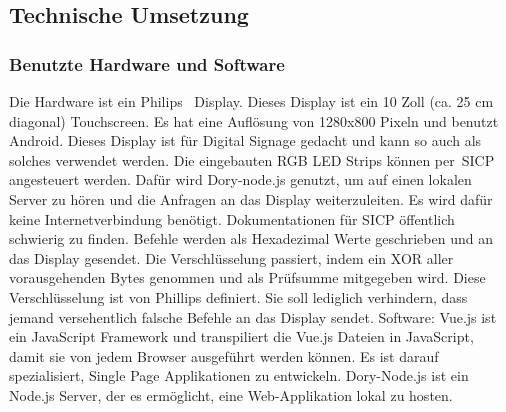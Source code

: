 
\subsection{Technische Umsetzung}\label{subsec:technische-umsetzung}
\subsubsection{Benutzte Hardware und Software}
\newline
Die Hardware ist ein Philips~\cite{10BDL4551T/00} Display.
Dieses Display ist ein 10 Zoll (ca. 25 cm diagonal) Touchscreen.
Es hat eine Auflösung von 1280x800 Pixeln und benutzt Android.
Dieses Display ist für Digital Signage gedacht und kann so auch als solches verwendet werden.
Die eingebauten RGB LED Strips können per~\gls{SICP} angesteuert werden.
Dafür wird Dory-node.js genutzt, um auf einen lokalen Server zu hören und die Anfragen an das Display weiterzuleiten.
Es wird dafür keine Internetverbindung benötigt.
Dokumentationen für SICP öffentlich schwierig zu finden.
Befehle werden als Hexadezimal Werte geschrieben und an das Display gesendet.
Die Verschlüsselung passiert, indem ein XOR aller vorausgehenden Bytes genommen und als Prüfsumme mitgegeben wird.
Diese Verschlüsselung ist von Phillips definiert.
Sie soll lediglich verhindern, dass jemand versehentlich falsche Befehle an das Display sendet.
\newline
\newline
Software:
\newline
Vue.js ist ein JavaScript Framework und transpiliert die Vue.js Dateien in JavaScript, damit sie von jedem Browser ausgeführt werden können.
Es ist darauf spezialisiert, Single Page Applikationen zu entwickeln.
\newline
\newline
{}
Dory-Node.js ist ein Node.js Server, der es ermöglicht, eine Web-Applikation lokal zu hosten.
